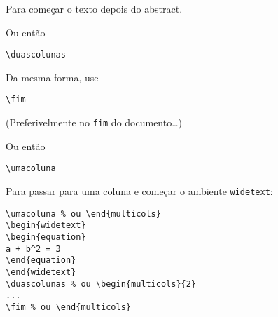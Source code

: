 Para começar o texto depois do abstract.

Ou então

\begin{verbatim}
\duascolunas
\end{verbatim}


Da mesma forma, use
\begin{verbatim} 
\fim
\end{verbatim}

(Preferivelmente no \verb+fim+ do documento\ldots)

Ou então

\begin{verbatim}
\umacoluna
\end{verbatim}

Para passar para uma coluna e começar o ambiente \verb+widetext+:

\begin{verbatim}
\umacoluna % ou \end{multicols}
\begin{widetext}
\begin{equation}
a + b^2 = 3
\end{equation}
\end{widetext}
\duascolunas % ou \begin{multicols}{2}
...
\fim % ou \end{multicols}
\end{verbatim}

